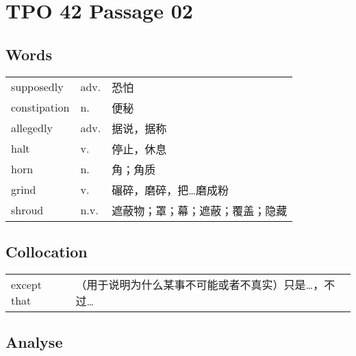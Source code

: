 \section{TPO 42 Passage 02}

\subsection{Words}

\begin{tabular}{lll}
    supposedly   & adv. & 恐怕               \\
    constipation & n.   & 便秘               \\
    allegedly    & adv. & 据说，据称            \\
    halt         & v.   & 停止，休息            \\
    horn         & n.   & 角；角质             \\
    grind        & v.   & 碾碎，磨碎，把…磨成粉      \\
    shroud       & n.v. & 遮蔽物；罩；幕；遮蔽；覆盖；隐藏 \\
\end{tabular}

\subsection{Collocation}

\begin{tabular}{ll}
    except that & （用于说明为什么某事不可能或者不真实）只是…，不过… \\
\end{tabular}

\newpage

\subsection{Analyse}

